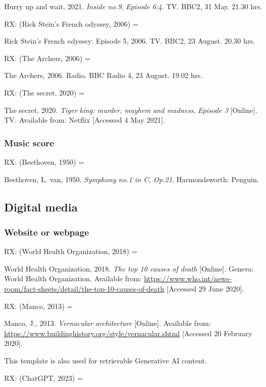 Hurry up and wait, 2021. \emph{Inside no.9}, \emph{Episode 6:4}. TV. BBC2, 31 May. 21.30 hrs.


RX: (Rick Stein’s French odyssey, 2006) = \cite{rsfo2006ep5}

Rick Stein's French odyssey: Episode 5, 2006. TV. BBC2, 23 August. 20.30 hrs.


RX: (The Archers, 2006) = \cite{archers20060823}

The Archers, 2006. Radio. BBC Radio 4, 23 August. 19.02 hrs.


RX: (The secret, 2020) = \cite{tkmmm2020ts}

The secret, 2020. \emph{Tiger king: murder, mayhem and madness}, \emph{Episode 3} [Online]. TV. Available from: Netflix [Accessed 4 May 2021].



\subsubsection*{Music score}

RX: (Beethoven, 1950) = \cite{beethoven1950symph1}

Beethoven, L. van, 1950. \emph{Symphony no.1 in C, Op.21}. Harmondsworth: Penguin.



\subsection{Digital media}

\subsubsection*{Website or webpage}

RX: (World Health Organization, 2018) = \cite{who2018ttc}

World Health Organization, 2018. \emph{The top 10 causes of death} [Online]. Geneva: World Health Organization. Available from: \url{https://www.who.int/news-room/fact-sheets/detail/the-top-10-causes-of-death} [Accessed 29 June 2020].


RX: (Manco, 2013) = \cite{manco2013va}

Manco, J., 2013. \emph{Vernacular architecture} [Online]. Available from: \url{https://www.buildinghistory.org/style/vernacular.shtml} [Accessed 20 February 2020].


This template is also used for retrievable Generative AI content.

RX: (ChatGPT, 2023) = \cite{chatgpt2023wcr}

